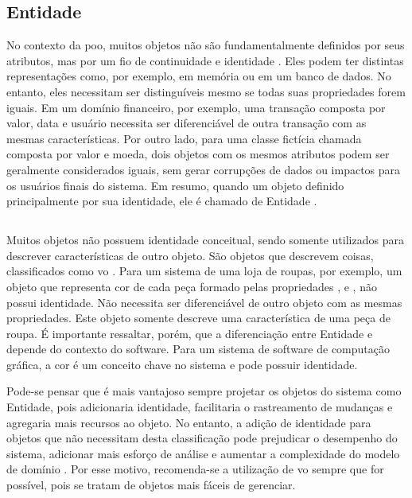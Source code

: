 \subsection{Entidade}
No contexto da \acrshort{poo}, muitos objetos não são fundamentalmente definidos por seus atributos, mas por um fio de continuidade e identidade \cite{evans2004ddd}. Eles podem ter distintas representações como, por exemplo, em memória ou em um banco de dados. No entanto, eles necessitam ser distinguíveis mesmo se todas suas propriedades forem iguais. Em um domínio financeiro, por exemplo, uma transação composta por valor, data e usuário necessita ser diferenciável de outra transação com as mesmas características. Por outro lado, para uma classe fictícia chamada  composta por valor e moeda, dois objetos com os mesmos atributos podem ser geralmente considerados iguais, sem gerar corrupções de dados ou impactos para os usuários finais do sistema. Em resumo, quando um objeto definido principalmente por sua identidade, ele é chamado de Entidade \cite{evans2004ddd}.

\subsection{}
Muitos objetos não possuem identidade conceitual, sendo somente utilizados para descrever características de outro objeto. São objetos que descrevem coisas, classificados como \acrshort{vo} \cite{evans2004ddd}. Para um sistema de uma loja de roupas, por exemplo, um objeto que representa cor de cada peça formado pelas propriedades ,  e , não possui identidade. Não necessita ser diferenciável de outro objeto com as mesmas propriedades. Este objeto somente descreve uma característica de uma peça de roupa. É importante ressaltar, porém, que a diferenciação entre Entidade e  depende do contexto do software. Para um sistema de software de computação gráfica, a cor é um conceito chave no sistema e pode possuir identidade.

Pode-se pensar que é mais vantajoso sempre projetar os objetos do sistema como Entidade, pois adicionaria identidade, facilitaria o rastreamento de mudanças e agregaria mais recursos ao objeto. No entanto, a adição de identidade para objetos que não necessitam desta classificação pode prejudicar o desempenho do sistema, adicionar mais esforço de análise e aumentar a complexidade do modelo de domínio \cite{evans2004ddd}. Por esse motivo, recomenda-se a utilização de \acrshort{vo} sempre que for possível, pois se tratam de objetos mais fáceis de gerenciar.

